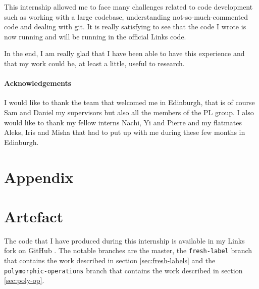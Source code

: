 \documentclass[11pt, nonacm=true, language=french, language=english]{acmart}
\begin{document}
This internship allowed me to face many challenges related to code development such as working with a large codebase, understanding not-so-much-commented code and dealing with git. It is really satisfying to see that the code I wrote is now running and will be running in the official Links code.

In the end, I am really glad that I have been able to have this experience and that my work could be, at least a little, useful to research.

\paragraph{Acknowledgements}
\label{sec:acknowledgement}

I would like to thank the team that welcomed me in Edinburgh, that is of course Sam and Daniel my supervisors but also all the members of the PL group. I also would like to thank my fellow interns Nachi, Yi and Pierre and my flatmates Aleks, Iris and Misha that had to put up with me during these few months in Edinburgh.

























\newpage

\appendix

\section*{Appendix}

\section{Artefact}
\label{sec:code-production}

The code that I have produced during this internship is available in my Links fork on GitHub \cite{gh:mylinks}. The notable branches are the master, the \texttt{fresh-label} branch that contains the work described in section \ref{sec:fresh-labels} and the \texttt{polymorphic-operations} branch that contains the work described in section \ref{sec:poly-op}.
\end{document}
